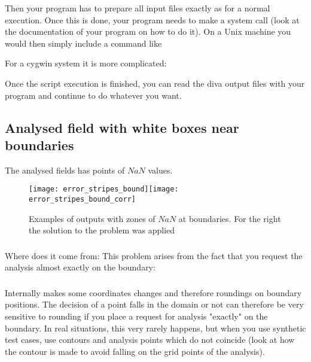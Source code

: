 Then your program has to prepare all input files exactly as for a normal \diva execution. Once this is done, your program needs to make a system call (look at the documentation of your program on how to do it). On a Unix machine you would then simply include a command like


For a cygwin system it is more complicated:


Once the script execution is finished, you can read the diva output files with your program and continue to do whatever you want.






\subsection{Analysed field with white boxes near boundaries}

The analysed fields has points of $NaN$ values.

\begin{figure}[htpb]
\centering
\texttt{[image: error\_stripes\_bound]}\texttt{[image: error\_stripes\_bound\_corr]}
\caption{Examples of \diva outputs with zones of $NaN$ at boundaries. For the right the solution to the problem was applied \label{fig:error_stripes}}
\end{figure}

\subsubsection{\question}
Where does it come from: This problem arises from the fact that you request the analysis almost exactly on the boundary: 



\subsubsection{\answer}
Internally \diva makes some coordinates changes and therefore roundings on boundary positions. The decision of a point falls in the domain or not can therefore be very sensitive
to rounding if you place a request for analysis "exactly" on the boundary. In real situations, this very rarely happens, but when you use synthetic test cases, use contours and analysis points which do not coincide (look at  how the contour is made to avoid falling on the grid points of the analysis).




